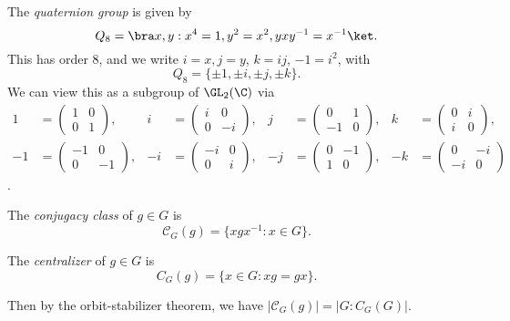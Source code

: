 \documentclass[a4paper]{article}
\begin{document}
\begin{defi}
  The \emph{quaternion group} is given by
  \[
    Q_8 = \bra x, y: x^4 = 1, y^2 = x^2, yxy^{-1} = x^{-1}\ket.
  \]
  This has order $8$, and we write $i = x, j = y$, $k = ij$, $-1 = i^2$, with
  \[
    Q_8 = \{\pm 1, \pm i, \pm j, \pm k\}.
  \]
  We can view this as a subgroup of $\GL_2(\C)$ via
  \begin{align*}
    1 &= \begin{pmatrix}
      1&0\\0&1
    \end{pmatrix},&
    i &= \begin{pmatrix}
      i & 0\\0&-i
    \end{pmatrix},&
    j &= \begin{pmatrix}
      0&1\\-1&0
    \end{pmatrix},&
    k &= \begin{pmatrix}
      0&i\\i&0
    \end{pmatrix},\\
    -1 &= \begin{pmatrix}
      -1&0\\0&-1
    \end{pmatrix},&
    -i &= \begin{pmatrix}
      -i & 0\\0&i
    \end{pmatrix},&
    -j &= \begin{pmatrix}
      0&-1\\1&0
    \end{pmatrix},&
    -k &= \begin{pmatrix}
      0&-i\\-i&0
    \end{pmatrix}
  \end{align*}.
\end{defi}

\begin{defi}
  The \emph{conjugacy class} of $g \in G$ is
  \[
    \mathcal{C}_G(g)=\{xgx^{-1}: x \in G\}.
  \]
\end{defi}

\begin{defi}[Centralizer]
  The \emph{centralizer} of $g \in G$ is
  \[
    C_G(g) = \{x \in G: xg = gx\}.
  \]
\end{defi}
Then by the orbit-stabilizer theorem, we have $|\mathcal{C}_G(g)| = |G: C_G(G)|$.
\end{document}
